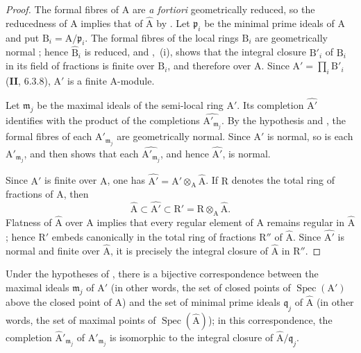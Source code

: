 \begin{proof}

The formal fibres of $\mathrm{A}$ are \emph{a fortiori} geometrically reduced, so the reducedness of $\mathrm{A}$ implies that of $\widehat{\mathrm{A}}$ by . Let $\mathfrak{p}_i$ be the minimal prime ideals of $\mathrm{A}$ and put $\mathrm{B}_i=\mathrm{A}/\mathfrak{p}_i$. The formal fibres of the local rings $\mathrm{B}_i$ are geometrically normal ; hence $\widehat{\mathrm{B}}_i$ is reduced, and ,~(i), shows that the integral closure $\mathrm{B}'_i$ of $\mathrm{B}_i$ in its field of fractions is finite over $\mathrm{B}_i$, and therefore over $\mathrm{A}$. Since $\mathrm{A}'=\prod_i\mathrm{B}'_i$ (\textbf{II}, $6.3.8$), $\mathrm{A}'$ is a finite $\mathrm{A}$-module.

Let $\mathfrak{m}_j$ be the maximal ideals of the semi-local ring $\mathrm{A}'$. Its completion $\widehat{\mathrm{A}'}$ identifies with the product of the completions $\widehat{\mathrm{A}'_{\mathfrak{m}_j}}$. By the hypothesis and , the formal fibres of each $\mathrm{A}'_{\mathfrak{m}_j}$ are geometrically normal. Since $\mathrm{A}'$ is normal, so is each $\mathrm{A}'_{\mathfrak{m}_j}$, and  then shows that each $\widehat{\mathrm{A}'_{\mathfrak{m}_j}}$, and hence $\widehat{\mathrm{A}'}$, is normal.

Since $\mathrm{A}'$ is finite over $\mathrm{A}$, one has $\widehat{\mathrm{A}'}=\mathrm{A}'\otimes_\mathrm{A}\widehat{\mathrm{A}}$. If $\mathrm{R}$ denotes the total ring of fractions of $\mathrm{A}$, then
\[
  \widehat{\mathrm{A}}\subset\widehat{\mathrm{A}'}
  \subset \mathrm{R}'=\mathrm{R}\otimes_\mathrm{A}\widehat{\mathrm{A}}.
\]
Flatness of $\widehat{\mathrm{A}}$ over $\mathrm{A}$ implies that every regular element of $\mathrm{A}$ remains regular in $\widehat{\mathrm{A}}$; hence $\mathrm{R}'$ embeds canonically in the total ring of fractions $\mathrm{R}''$ of $\widehat{\mathrm{A}}$. Since $\widehat{\mathrm{A}'}$ is normal and finite over $\widehat{\mathrm{A}}$, it is precisely the integral closure of $\widehat{\mathrm{A}}$ in $\mathrm{R}''$.
\end{proof}

\begin{corollary}[7.6.2]
\label{IV.7.6.2}
Under the hypotheses of , there is a bijective correspondence between the maximal ideals $\mathfrak{m}_j$ of $\mathrm{A}'$ (in other words, the set of closed points of $\operatorname{Spec}(\mathrm{A}')$ above the closed point of $\mathrm{A}$) and the set of minimal prime ideals $\mathfrak{q}_j$ of $\widehat{\mathrm{A}}$ (in other words, the set of maximal points of $\operatorname{Spec}(\widehat{\mathrm{A}})$); in this correspondence, the completion $\widehat{\mathrm{A}}'_{\mathfrak{m}_j}$ of $\mathrm{A}'_{\mathfrak{m}_j}$ is isomorphic to the integral closure of $\widehat{\mathrm{A}}/\mathfrak{q}_j$.
\end{corollary}

